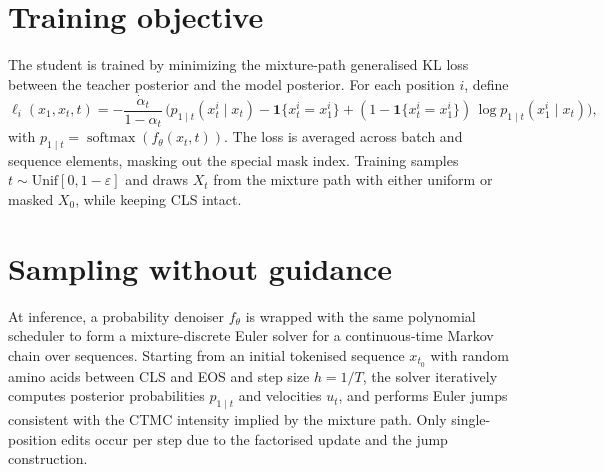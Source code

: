 \section*{Training objective}
The student is trained by minimizing the mixture-path generalised KL loss between the teacher posterior and the model posterior. For each position \(i\), define
\[\ell_i(x_1,x_t,t) = -\frac{\dot\alpha_t}{1-\alpha_t}\,\Big(p_{1\mid t}(x_t^i\mid x_t)-\mathbf{1}\{x_t^i=x_1^i\} + (1-\mathbf{1}\{x_t^i=x_1^i\})\,\log p_{1\mid t}(x_1^i\mid x_t)\Big),\]
with \(p_{1\mid t}=\operatorname{softmax}(f_\theta(x_t,t))\). The loss is averaged across batch and sequence elements, masking out the special mask index. Training samples \(t\sim\mathrm{Unif}[0,1-\varepsilon]\) and draws \(X_t\) from the mixture path with either uniform or masked \(X_0\), while keeping CLS intact.

\section*{Sampling without guidance}
At inference, a probability denoiser \(f_\theta\) is wrapped with the same polynomial scheduler to form a mixture-discrete Euler solver for a continuous-time Markov chain over sequences. Starting from an initial tokenised sequence \(x_{t_0}\) with random amino acids between CLS and EOS and step size \(h=1/T\), the solver iteratively computes posterior probabilities \(p_{1\mid t}\) and velocities \(u_t\), and performs Euler jumps consistent with the CTMC intensity implied by the mixture path. Only single-position edits occur per step due to the factorised update and the jump construction.

